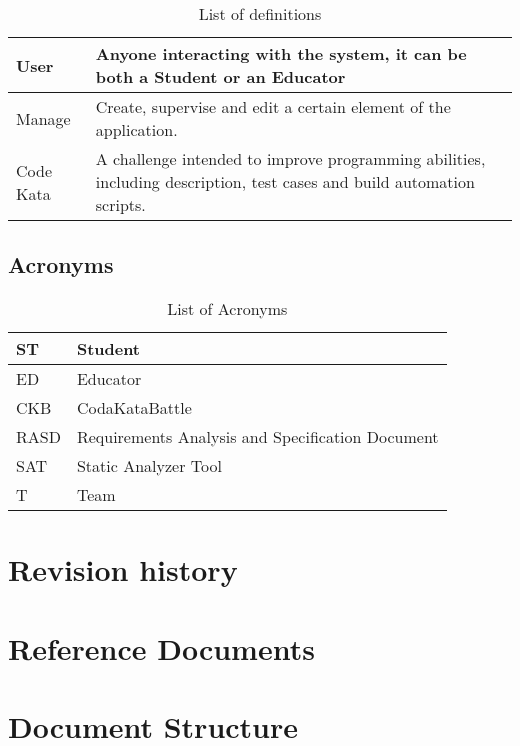 \begin{table}[H]
  \begin{tabular}{|l|p{}|}

    \hline
    User & Anyone interacting with the system, it can be both a Student or an Educator    \\
    \hline
    Manage & Create, supervise and edit a certain element of the application. \\
    \hline
    Code Kata & A challenge intended to improve programming abilities, including description, test cases and build automation scripts. \\
    \hline
  \end{tabular}
  \caption{List of definitions}
  \label{tab:definitions}
\end{table}

\subsection{Acronyms}
\label{ss:Acronyms}

\begin{table}[H]
  \begin{tabular}{|l|l|}

    \hline
    ST & Student \\
    \hline
    ED & Educator \\
    \hline
    CKB & CodaKataBattle \\
    \hline
    RASD & Requirements Analysis and Specification Document     \\
    \hline
    SAT & Static Analyzer Tool    \\
    \hline
    T & Team    \\
    \hline
  \end{tabular}
  \caption{List of Acronyms}
  \label{tab:acronyms}
\end{table}


\section{Revision history}
\label{s:revision-history}%

\section{Reference Documents}
\label{s:reference-documents}%


\section{Document Structure}
\label{s:document-structure}%
